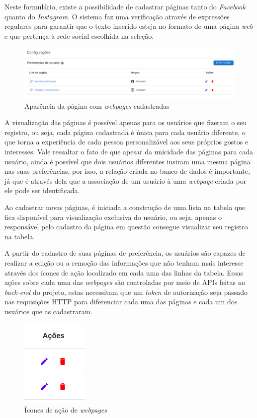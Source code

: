 Neste formulário, existe a possibilidade de cadastrar páginas tanto do
\textit{Facebook} quanto do \textit{Instagram}. O sistema faz uma verificação
através de expressões regulares para garantir que o texto inserido esteja no
formato de uma página \textit{web} e que pertença à rede social escolhida na
seleção.

\begin{figure}[h]
    \centering
    \includegraphics[width=1\textwidth]{figuras/webpagesTable.png}
    \caption{Aparência da página com \textit{webpages} cadastradas}
    \label{fig:enter-label}
\end{figure}

A visualização das páginas é possível apenas para os usuários que fizeram o seu
registro, ou seja, cada página cadastrada é única para cada usuário diferente,
o que torna a experiência de cada pessoa personalizável aos seus próprios
gostos e interesses. Vale ressaltar o fato de que apesar da unicidade das
páginas para cada usuário, ainda é possível que dois usuários diferentes
insiram uma mesma página nas suas preferências, por isso, a relação
 criada no banco de dados é importante, já que é
através dela que a associação de um usuário à uma \textit{webpage} criada por
ele pode ser identificada.

Ao cadastrar novas páginas, é iniciada a construção de uma lista na tabela que
fica disponível para visualização exclusiva do usuário, ou seja, apenas o
responsável pelo cadastro da página em questão consegue visualizar seu registro
na tabela.

A partir do cadastro de suas páginas de preferência, os usuários são capazes de
realizar a edição ou a remoção das informações que não tenham mais interesse
através dos ícones de ação localizado em cada uma das linhas da tabela. Essas
ações sobre cada uma das \textit{webpages} são controladas por meio de
\acp{API} feitas no \textit{back-end} do projeto, estas necessitam que um
\textit{token} de autorização seja passado nas requisições \acs{HTTP} para
diferenciar cada uma das páginas e cada um dos usuários que as cadastraram.

\begin{figure}[h]
    \centering
    \includegraphics[scale=.5]{figuras/webpageActions.png}
    \caption{Ícones de ação de \textit{webpages}}
    \label{fig:enter-label}
\end{figure}

